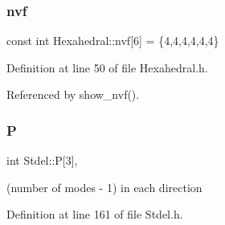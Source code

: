 \mbox{\label{classHexahedral_a2ee5b71919dfc0b878e5282bb86909f9}} 
\subsubsection{\texorpdfstring{nvf}{nvf}}
{\footnotesize\ttfamily const int Hexahedral\+::nvf\mbox{[}6\mbox{]} = \{4,4,4,4,4,4\}\hspace{0.3cm}{\ttfamily [private]}}



Definition at line 50 of file Hexahedral.\+h.



Referenced by show\+\_\+nvf().

\mbox{\label{classStdel_a05cbb3f2a3fa0bc04a74e347dc6574cf}} 
\subsubsection{\texorpdfstring{P}{P}}
{\footnotesize\ttfamily int Stdel\+::P\mbox{[}3\mbox{]}\hspace{0.3cm}{\ttfamily [protected]}, {\ttfamily [inherited]}}



(number of modes -\/ 1) in each direction 



Definition at line 161 of file Stdel.\+h.



